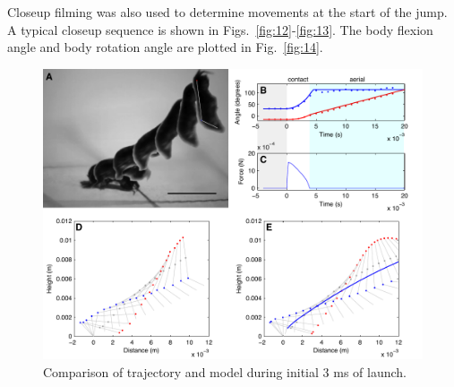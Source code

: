 \documentclass{jeb}
\newcommand{\Hyale}{\Genus{H.~pugettensis}}
\begin{document}
Closeup filming was also used to determine movements at the start of the jump.  A typical closeup sequence is shown in Figs.~\ref{fig:12}-\ref{fig:13}. The body flexion angle and body rotation angle are plotted in Fig.~\ref{fig:14}.  
\begin{figure}
\begin{center}
\includegraphics{figures/AmphipodLaunchFull.pdf}
\end{center}
\caption{Comparison of trajectory and model during initial 3 ms of launch.}
\end{figure}



\end{document}
